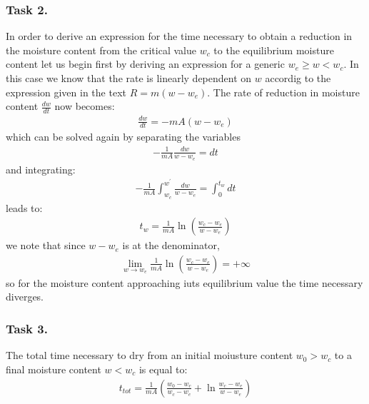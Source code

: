 \documentclass[letterpaper,10pt,english]{jupyterBook}
\begin{document}
\subsubsection{Task 2.}
\label{\detokenize{Exercise_W10_2021:task-2}}
\sphinxAtStartPar
In order to derive an expression for the time necessary to obtain a reduction in the moisture content from the critical value  \(w_c\) to the equilibrium moisture content let us begin first by deriving an expression for a generic \(w_e\geq{w}<w_c\).
In this case we know that the rate is linearly dependent on \(w\) accordig to the expression given in the text \(R=m(w-w_e)\).
The rate of reduction in moisture content \(\frac{dw}{dt}\) now becomes:
\begin{equation*}
\begin{split}
\frac{dw}{dt}=-mA(w-w_e)
\end{split}
\end{equation*}
\sphinxAtStartPar
which can be solved again by separating the variables
\begin{equation*}
\begin{split}
-\frac{1}{mA}\frac{dw}{w-w_e}=dt
\end{split}
\end{equation*}
\sphinxAtStartPar
and integrating:
\begin{equation*}
\begin{split}
-\frac{1}{mA}\int_{w_c}^{w^\prime}\frac{dw}{w-w_e}=\int_0^{t_w}dt
\end{split}
\end{equation*}
\sphinxAtStartPar
leads to:
\begin{equation*}
\begin{split}
t_w=\frac{1}{mA}\ln\left(\frac{w_c-w_e}{w-w_e}\right)
\end{split}
\end{equation*}
\sphinxAtStartPar
we note that since \({w-w_e}\) is at the denominator,
\begin{equation*}
\begin{split}
\lim_{w\rightarrow{w_e}}\frac{1}{mA}\ln\left(\frac{w_c-w_e}{w-w_e}\right)=+\infty
\end{split}
\end{equation*}
\sphinxAtStartPar
so for the moisture content approaching iuts equilibrium value the time necessary diverges.


\subsubsection{Task 3.}
\label{\detokenize{Exercise_W10_2021:task-3}}
\sphinxAtStartPar
The total time necessary to dry from an initial moiusture content \(w_0>w_c\) to a final moisture content \(w<w_c\) is equal to:
\begin{equation*}
\begin{split}
t_{tot}=\frac{1}{mA}\left(\frac{w_0-w_c}{w_c-w_e}+\ln\frac{w_c-w_e}{w-w_e}\right)
\end{split}
\end{equation*}
\end{document}
